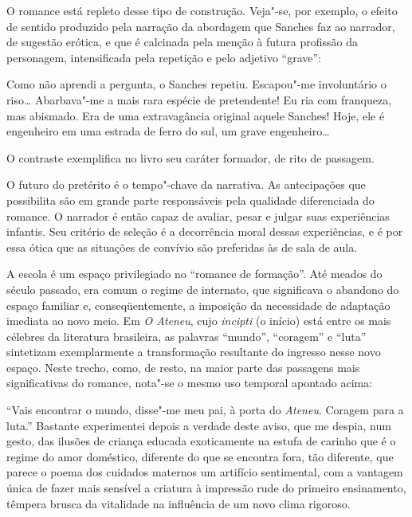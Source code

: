 O romance está repleto desse tipo de construção. Veja"-se, por exemplo,
o efeito de sentido produzido pela narração da abordagem que Sanches
faz ao narrador, de sugestão erótica, e que é calcinada pela menção à
futura profissão da personagem, intensificada pela repetição e pelo
adjetivo ``grave'':

\begin{hedraquote}
Como não aprendi a pergunta, o Sanches repetiu. Escapou"-me
involuntário o riso\ldots{} Abarbava"-me a mais rara espécie de
pretendente! Eu ria com franqueza, mas abismado. Era de uma
extravagância original aquele Sanches! Hoje, ele é engenheiro em uma
estrada de ferro do sul, um grave engenheiro\ldots{} 
\end{hedraquote}

O contraste exemplifica no livro seu caráter formador, de rito de
passagem.

O futuro do pretérito é o tempo"-chave da narrativa. As antecipações
que possibilita são em grande parte responsáveis pela qualidade
diferenciada do romance. O narrador é então capaz de avaliar, pesar e
julgar suas experiências infantis. Seu critério de seleção é a
decorrência moral dessas experiências, e é por essa ótica que as
situações de convívio são preferidas às de sala de aula. 

A escola é um espaço privilegiado no ``romance de
formação''. Até meados do século passado, era comum o regime de
internato, que significava o abandono do espaço familiar e,
conseqüentemente, a imposição da necessidade de adaptação imediata ao
novo meio. Em \textit{O Ateneu}, cujo
\textit{incipti} (o início) está entre os
mais célebres da literatura brasileira, as palavras ``mundo'', ``coragem''
e ``luta'' sintetizam exemplarmente a transformação resultante do
ingresso nesse novo espaço. Neste trecho, como, de resto, na maior
parte das passagens mais significativas do romance, nota"-se o mesmo
uso temporal apontado acima:

\begin{hedraquote}
``Vais encontrar o mundo, disse"-me meu pai, à porta do
\textit{Ateneu}. Coragem para a luta.''
Bastante experimentei depois a verdade deste aviso, que me despia, num
gesto, das ilusões de criança educada exoticamente na estufa de carinho
que é o regime do amor doméstico, diferente do que se encontra fora,
tão diferente, que parece o poema dos cuidados maternos um artifício
sentimental, com a vantagem única de fazer mais sensível a criatura à
impressão rude do primeiro ensinamento, têmpera brusca da vitalidade na
influência de um novo clima rigoroso.
\end{hedraquote}

